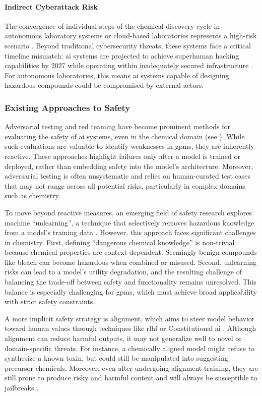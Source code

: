 \paragraph{Indirect Cyberattack Risk} The convergence of individual steps of the chemical discovery cycle in autonomous laboratory systems or cloud-based laboratories represents a high-risk scenario \autocite{rouleau2025risks}.
Beyond traditional cybersecurity threats, these systems face a critical timeline mismatch: \gls{ai} systems are projected to achieve superhuman hacking capabilities by 2027 while operating within inadequately secured infrastructure \autocite{dean2025security}. 
For autonomous laboratories, this means \gls{ai} systems capable of designing hazardous compounds could be compromised by external actors.

\subsubsection{Existing Approaches to Safety} Adversarial testing and red teaming have become prominent methods for evaluating the safety of \gls{ai} systems, even in the chemical domain (see ). 
While such evaluations are valuable to identify weaknesses in \glspl{gpm}, they are inherently reactive. 
These approaches highlight failures only after a model is trained or deployed, rather than embedding safety into the model's architecture. 
Moreover, adversarial testing is often unsystematic and relies on human-curated test cases that may not range across all potential risks, particularly in complex domains such as chemistry.

To move beyond reactive measures, an emerging field of safety research explores machine \enquote{unlearning}, a technique that selectively removes hazardous knowledge from a model's training data \autocite{barez2025open}. 
However, this approach faces significant challenges in chemistry. First, defining \enquote{dangerous chemical knowledge} is non-trivial because chemical properties are context-dependent.
Seemingly benign compounds like bleach can become hazardous when combined or misused. 
Second, unlearning risks can lead to a model's utility degradation, and the resulting challenge of balancing the trade-off between safety and functionality remains unresolved. 
This balance is especially challenging for \glspl{gpm}, which must achieve broad applicability with strict safety constraints.

A more implicit safety strategy is alignment, which aims to steer model behavior toward human values through techniques like \gls{rlhf} or Constitutional \gls{ai} \autocite{bai2022constitutional}. Although alignment can reduce harmful outputs, it may not generalize well to novel or domain-specific threats. 
For instance, a chemically aligned model might refuse to synthesize a known toxin, but could still be manipulated into suggesting precursor chemicals.  
Moreover, even after undergoing alignment training, they are still prone to produce risky and harmful content and will always be susceptible to jailbreaks \autocite{kuntz2025os-harm, yona2024stealing, lynch2025agentic}.

